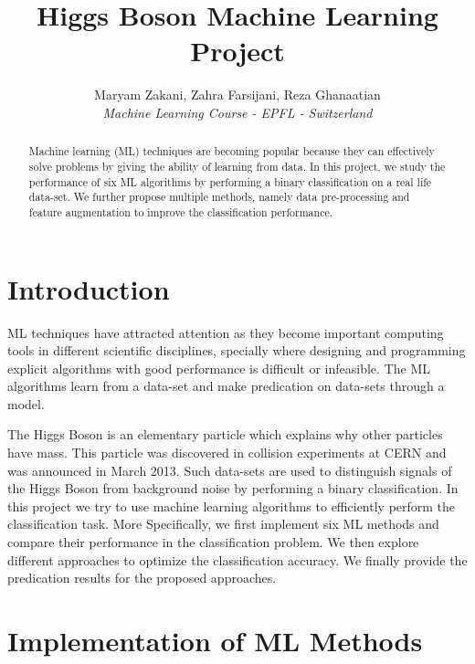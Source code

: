 \documentclass[10pt,conference,compsocconf]{IEEEtran}
\begin{document}
\title{Higgs Boson Machine Learning Project}

\author{
  Maryam Zakani, Zahra Farsijani, Reza Ghanaatian\\
  \textit{Machine Learning Course - EPFL - Switzerland}
}

\maketitle

\begin{abstract}
Machine learning (ML) techniques are becoming popular because they can effectively solve problems by giving the ability of learning from data.
In this project, we study the performance of six ML algorithms by performing a binary classification on a real life data-set.
We further propose multiple methods, namely data pre-processing and feature augmentation to improve the classification performance. 
\end{abstract}

\section{Introduction}

\Gls{ML} techniques have attracted attention as they become important computing tools in different scientific disciplines, specially where designing and programming explicit algorithms with good performance is difficult or infeasible. The \gls{ML} algorithms learn from a data-set and make predication on data-sets through a model. 

The Higgs Boson is an elementary particle which explains why other particles have mass. This particle was discovered in collision experiments at CERN and was announced in March 2013. Such data-sets are used to distinguish signals of the Higgs Boson from background noise by performing a binary classification.
In this project we try to use machine learning algorithms to efficiently perform the classification task.
More Specifically, we first implement six \gls{ML} methods and compare their performance in the classification problem. We then explore different approaches to optimize the classification accuracy. We finally provide the predication results for the proposed approaches.


\section{Implementation of \gls{ML} Methods}\label{sec:ml}
\end{document}
